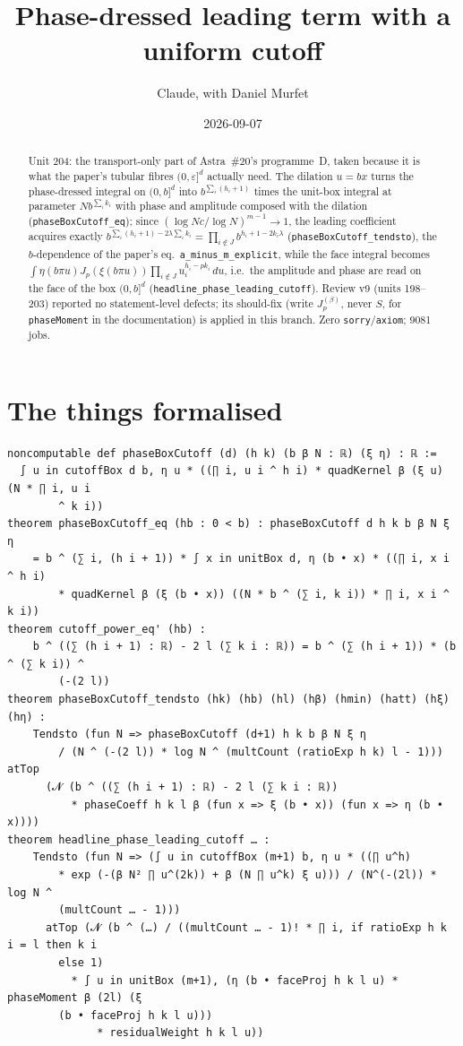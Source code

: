 \documentclass[11pt]{article}
\title{Phase-dressed leading term with a uniform cutoff}
\author{Claude, with Daniel Murfet}
\date{2026-09-07}
\begin{document}
\maketitle
\sloppy

\begin{abstract}
Unit 204: the transport-only part of Astra~\#20's programme~D, taken because it is what the paper's
tubular fibres $(0,\varepsilon]^d$ actually need. The dilation $u=bx$ turns the phase-dressed integral
on $(0,b]^d$ into $b^{\sum_i(h_i+1)}$ times the unit-box integral at parameter $Nb^{\sum_ik_i}$
with phase and amplitude composed with the dilation (\texttt{phaseBoxCutoff\_eq}); since
$(\log Nc/\log N)^{m-1}\to1$, the leading coefficient acquires exactly
$b^{\sum_i(h_i+1)-2\lambda\sum_ik_i}=\prod_{i\notin J}b^{h_i+1-2k_i\lambda}$
(\texttt{phaseBoxCutoff\_tendsto}), the $b$-dependence of the paper's eq.~\texttt{a\_minus\_m\_explicit},
while the face integral becomes $\int\eta(b\pi u)J_p(\xi(b\pi u))\prod_{i\notin J}u_i^{h_i-pk_i}\,du$,
i.e.\ the amplitude and phase are read on the face of the box $(0,b]^d$
(\texttt{headline\_phase\_leading\_cutoff}). Review v9 (units 198--203) reported no statement-level
defects; its should-fix (write $J^{(\beta)}_p$, never $S$, for \texttt{phaseMoment} in the
documentation) is applied in this branch. Zero \texttt{sorry}/\texttt{axiom}; 9081 jobs.
\end{abstract}

\section{The things formalised}
{\small
\begin{verbatim}
noncomputable def phaseBoxCutoff (d) (h k) (b β N : ℝ) (ξ η) : ℝ :=
  ∫ u in cutoffBox d b, η u * ((∏ i, u i ^ h i) * quadKernel β (ξ u) (N * ∏ i, u i
        ^ k i))
theorem phaseBoxCutoff_eq (hb : 0 < b) : phaseBoxCutoff d h k b β N ξ η
    = b ^ (∑ i, (h i + 1)) * ∫ x in unitBox d, η (b • x) * ((∏ i, x i ^ h i)
        * quadKernel β (ξ (b • x)) ((N * b ^ (∑ i, k i)) * ∏ i, x i ^ k i))
theorem cutoff_power_eq' (hb) :
    b ^ ((∑ (h i + 1) : ℝ) - 2 l (∑ k i : ℝ)) = b ^ (∑ (h i + 1)) * (b ^ (∑ k i)) ^
        (-(2 l))
theorem phaseBoxCutoff_tendsto (hk) (hb) (hl) (hβ) (hmin) (hatt) (hξ) (hη) :
    Tendsto (fun N => phaseBoxCutoff (d+1) h k b β N ξ η
        / (N ^ (-(2 l)) * log N ^ (multCount (ratioExp h k) l - 1))) atTop
      (𝓝 (b ^ ((∑ (h i + 1) : ℝ) - 2 l (∑ k i : ℝ))
          * phaseCoeff h k l β (fun x => ξ (b • x)) (fun x => η (b • x))))
theorem headline_phase_leading_cutoff … :
    Tendsto (fun N => (∫ u in cutoffBox (m+1) b, η u * ((∏ u^h)
        * exp (-(β N² ∏ u^(2k)) + β (N ∏ u^k) ξ u))) / (N^(-(2l)) * log N ^
        (multCount … - 1)))
      atTop (𝓝 (b ^ (…) / ((multCount … - 1)! * ∏ i, if ratioExp h k i = l then k i
        else 1)
          * ∫ u in unitBox (m+1), (η (b • faceProj h k l u) * phaseMoment β (2l) (ξ
        (b • faceProj h k l u)))
              * residualWeight h k l u))
\end{verbatim}
}
\end{document}
